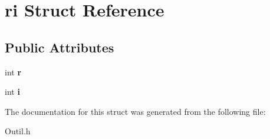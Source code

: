 \hypertarget{structri}{}\section{ri Struct Reference}
\label{structri}
\subsection*{Public Attributes}
\begin{DoxyCompactItemize}
\item 
int {\bfseries r}\hypertarget{structri_a1402c73b5c66b3a7d440ea561afc723c}{}\label{structri_a1402c73b5c66b3a7d440ea561afc723c}

\item 
int {\bfseries i}\hypertarget{structri_a6cf95fbc53c9b7ea92de0ff2bbbad51e}{}\label{structri_a6cf95fbc53c9b7ea92de0ff2bbbad51e}

\end{DoxyCompactItemize}


The documentation for this struct was generated from the following file\+:\begin{DoxyCompactItemize}
\item 
Outil.\+h\end{DoxyCompactItemize}

